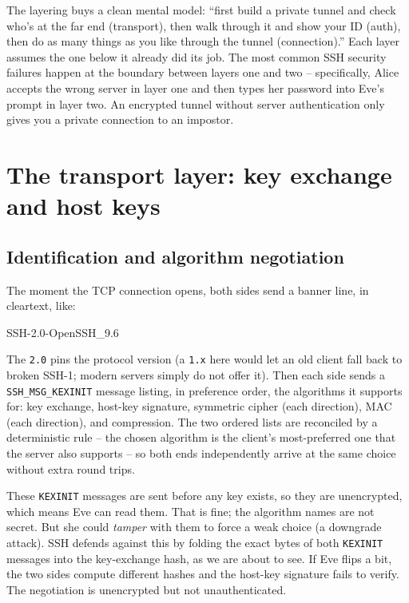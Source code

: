 \begin{intuitionbox}
The layering buys a clean mental model: ``first build a private tunnel and check who's at the far end (transport), then walk through it and show your ID (auth), then do as many things as you like through the tunnel (connection).'' Each layer assumes the one below it already did its job. The most common SSH security failures happen at the boundary between layers one and two -- specifically, Alice accepts the wrong server in layer one and then types her password into Eve's prompt in layer two. An encrypted tunnel without server authentication only gives you a private connection to an impostor.
\end{intuitionbox}

\section{The transport layer: key exchange and host keys}

\subsection{Identification and algorithm negotiation}

The moment the TCP connection opens, both sides send a banner line, in cleartext, like:

\begin{center}\ttfamily SSH-2.0-OpenSSH\_9.6\end{center}

The \texttt{2.0} pins the protocol version (a \texttt{1.x} here would let an old client fall back to broken SSH-1; modern servers simply do not offer it). Then each side sends a \texttt{SSH\_MSG\_KEXINIT} message listing, in preference order, the algorithms it supports for: key exchange, host-key signature, symmetric cipher (each direction), MAC (each direction), and compression. The two ordered lists are reconciled by a deterministic rule -- the chosen algorithm is the client's most-preferred one that the server also supports -- so both ends independently arrive at the same choice without extra round trips.

These \texttt{KEXINIT} messages are sent before any key exists, so they are unencrypted, which means Eve can read them. That is fine; the algorithm names are not secret. But she could \emph{tamper} with them to force a weak choice (a downgrade attack). SSH defends against this by folding the exact bytes of both \texttt{KEXINIT} messages into the key-exchange hash, as we are about to see. If Eve flips a bit, the two sides compute different hashes and the host-key signature fails to verify. The negotiation is unencrypted but not unauthenticated.

